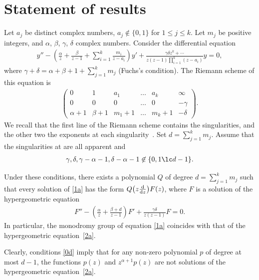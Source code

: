 \section{Statement of results}\label{section2}

Let $a_j$ be distinct complex numbers, $a_j\not\in\{0,1\}$ for $1\leq j\leq k$. Let $m_j$ be positive integers, and $\alpha$, $\beta$, $\gamma$, $\delta$ complex numbers. Consider the differential equation
\begin{gather}\label{1a}
y''-\left( \frac\alpha z+\frac\beta{z-1}+\sum_{i=1}^k \frac{m_i}{z-a_i}\right) y'+\frac{\gamma\delta z^k+\cdots{}}{z(z-1)\prod\limits_{i=1}^k(z-a_i)}y = 0,
\end{gather}
where $\gamma+\delta=\alpha+\beta+1+\sum\limits_{j=1}^km_j$ (Fuchs's condition). The Riemann scheme of this equation is
\begin{gather*}
\left(\begin{matrix}
0&1&a_1&\ldots&a_k&\infty\\
0&0&0&\ldots&0&-\gamma\\
\alpha+1&\beta+1&m_1+1&\ldots&m_k+1&-\delta
\end{matrix}\right).
\end{gather*}
We recall that the first line of the Riemann scheme contains the singularities, and the other two the exponents at each singularity~\cite{Mellin}. Set $d=\sum\limits_{j=1}^km_j$. Assume that the singularities at  are all apparent and
\begin{gather}\label{0d}
\gamma, \delta, \gamma-\alpha-1, \delta-\alpha-1 \not\in \{0,1\lc d-1\}.
\end{gather}

\begin{thm}\label{theorem1}
Under these conditions, there exists a polynomial $Q$ of degree $d=\sum\limits_{j=1}^km_j$ such that every solution of \eqref{1a} has the form $Q\big(z\frac{{\rm d}}{{\rm d}z}\big)F(z) $, where $F$ is a solution of the hypergeometric equation
\begin{gather}\label{2a}
F''-\left( \frac\alpha z+\frac{\beta+d}{z-1} \right) F'+\frac{\gamma\delta}{z(z-1)} F = 0.
\end{gather}
In particular, the monodromy group of equation \eqref{1a} coincides with that of the hypergeometric equation~\eqref{2a}.
\end{thm}

\begin{Remark}\label{remark1} Clearly, conditions \eqref{0d} imply that for any non-zero polynomial $p$ of degree at most $d-1$, the functions $p(z)$ and $z^{\alpha+1}p(z)$ are not solutions of the hypergeometric equation~\eqref{2a}.
\end{Remark}

